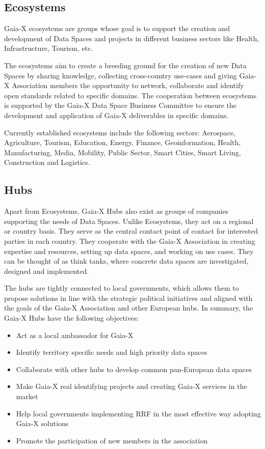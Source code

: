 \subsection{Ecosystems}\label{subsec:ecosystems}

Gaia-X ecosystems are groups whose goal is to support the creation and development of Data Spaces and projects in different business sectors like Health, Infrastructure, Tourism, etc\cite{gaiax}. %

The ecosystems aim to create a breeding ground for the creation of new Data Spaces by sharing knowledge, collecting cross-country use-cases and giving Gaia-X Association members the opportunity to network, collaborate and identify open standards related to specific domains.
The cooperation between ecosystems is supported by the Gaia-X Data Space Business Committee to ensure the development and application of Gaia-X deliverables in specific domains.

Currently established ecosystems include the following sectors: Aerospace, Agriculture, Tourism, Education, Energy, Finance, Geoinformation, Health, Manufacturing, Media, Mobility, Public Sector, Smart Cities, Smart Living, Construction and Logistics.

\subsection{Hubs}\label{subsec:hubs}

Apart from Ecosystems, Gaia-X Hubs also exist as groups of companies supporting the needs of Data Spaces\cite{gaiax}.
Unlike Ecosystems, they act on a regional or country basis.
They serve as the central contact point of contact for interested parties in each country.
They cooperate with the Gaia-X Association in creating expertise and resources, setting up data spaces, and working on use cases.
They can be thought of as think tanks, where concrete data spaces are investigated, designed and implemented.

The hubs are tightly connected to local governments, which allows them to propose solutions in line with the strategic political initiatives and aligned with the goals of the Gaia-X Association and other European hubs\cite{gaiax}.
In summary, the Gaia-X Hubs have the following objectives:
\begin{itemize}
    \item Act as a local ambassador for Gaia-X
    \item Identify territory specific needs and high priority data spaces
    \item Collaborate with other hubs to develop common pan-European data spaces
    \item Make Gaia-X real identifying projects and creating Gaia-X services in the market
    \item Help local governments implementing RRF in the most effective way adopting Gaia-X solutions
    \item Promote the participation of new members in the association
\end{itemize}
